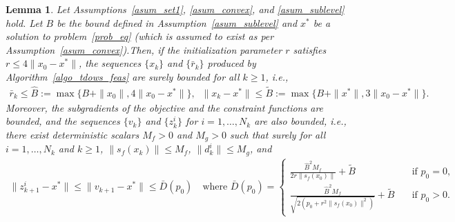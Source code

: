 \documentclass{article}
\theoremstyle{plain}
\newtheorem{lemma}[theorem]{Lemma}
\theoremstyle{definition}
\theoremstyle{remark}
\begin{document}
\begin{lemma}\label{lem_bounded_itr_tdows}
    Let Assumptions~\ref{asum_set1}, \ref{asum_convex}, and \ref{asum_sublevel} hold. Let $B$ be the bound defined in Assumption~\ref{asum_sublevel} and $x^*$ be a solution to problem~\eqref{prob_eq} (which is assumed to exist as per Assumption~\ref{asum_convex}).Then, if the initialization parameter $r$ satisfies $r \leq 4 \|x_0 - x^*\|$, the sequences $\{x_k\}$ and $\{\bar r_k\}$ produced by Algorithm~\ref{algo_tdows_feas} are surely bounded for all $k \geq 1$, i.e.,
    \begin{align*}
        \bar r_k \leq \widehat B := \max\{B + \|x_0\|, 4 \|x_0 - x^*\|\}, \;\; \|x_k-x^*\| \leq \widetilde B := \max\{B + \|x^*\|, 3 \|x_0 - x^*\|\} .
    \end{align*}
    Moreover, the subgradients of the objective and the constraint functions are bounded, and the sequences $\{v_k\}$ and $\{z_k^i\}$ for $i = 1, \ldots, N_k$ are also bounded, i.e., there exist deterministic scalars $M_f > 0$ and $M_g > 0$ such that surely for all $i = 1, \ldots, N_k$ and $k \geq 1$, $\|s_f(x_k)\| \leq M_f$, $\|d_k^i\| \leq M_g$, and
    \begin{align*}
        \|z_{k+1}^i - x^*\| \leq \|v_{k+1} - x^*\| \leq \bar D(p_0) \quad \text{where } \bar D(p_0) = \begin{cases}
            \frac{\widehat B^2 M_f}{2 r \|s_f(x_0)\|} + \widetilde B  \quad &\text{if $p_0 = 0$,} \\
            \frac{\widehat B^2 M_f}{\sqrt{2(p_0 + r^2 \|s_f(x_0)\|^2)}} + \widetilde B \quad &\text{if $p_0 > 0$.}
        \end{cases}
    \end{align*}
\end{lemma}
%
%
\end{document}
